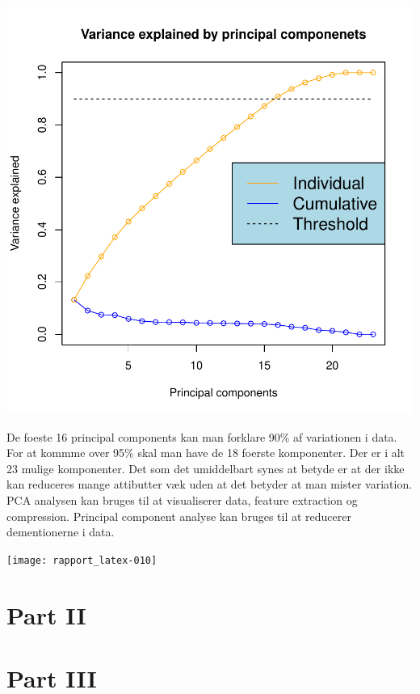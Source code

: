 \documentclass{report}
\begin{document}
\includegraphics{rapport_latex-009}

De foeste 16 principal components kan man forklare 90\% af variationen i data. For at kommme over 95\% skal man have de 18 foerste komponenter. Der er i alt 23 mulige komponenter.
Det som det umiddelbart synes at betyde er at der ikke kan reduceres mange attibutter væk uden at det betyder at man mister variation.
PCA analysen kan bruges til at visualiserer data, feature extraction og compression.
Principal component analyse kan bruges til at reducerer dementionerne i data.

\texttt{[image: rapport\_latex-010]}


\chapter{Part II}


\chapter{Part III}
\end{document}
